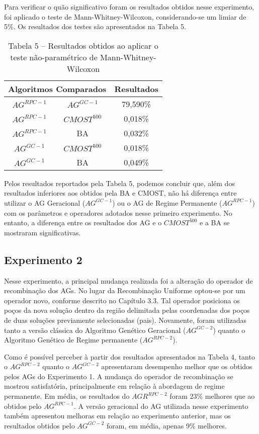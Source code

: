 Para verificar o quão significativo foram os resultados obtidos nesse experimento, foi aplicado o teste de Mann-Whitney-Wilcoxon, considerando-se um limiar de 5\%. Os resultados dos testes são apresentados na Tabela 5.

\begin{table}[H]
\centering
\caption{Tabela 5 – Resultados obtidos ao aplicar o teste não-paramétrico de Mann-Whitney-Wilcoxon}

\begin{tabular}{|c|c|c|}
\hline
\multicolumn{2}{|c|}{Algoritmos Comparados} & Resultados \\ \hline
$AG^{RPC-1}$ &	$AG^{GC-1}$ & 79,590\% \\ \hline
$AG^{RPC-1}$ & $CMOST^500$ & 0,018\% \\ \hline
$AG^{RPC-1}$ & BA & 0,032\% \\ \hline
$AG^{GC-1}$ & $CMOST^500$ & 0,018\% \\ \hline
$AG^{GC-1}$ & BA & 0,049\% \\ \hline

\end{tabular}
\end{table}

Pelos resultados reportados pela Tabela 5, podemos concluir que, além dos resultados inferiores aos obtidos pela BA e CMOST, não há diferença entre utilizar o AG Geracional ($AG^{GC-1}$) ou o AG de Regime Permanente ($AG^{RPC-1}$) com os parâmetros e operadores adotados nesse primeiro experimento. No entanto, a diferença entre os resultados dos AG e o $CMOST^500$ e a BA se mostraram  significativas.

\subsection{Experimento 2}

Nesse experimento, a principal mudança realizada foi a alteração do operador de recombinação dos AGs. No lugar da Recombinação Uniforme optou-se por um operador novo, conforme descrito no Capítulo 3.3. Tal operador posiciona os poços da nova solução dentro da região delimitada pelas coordenadas dos poços de duas soluções previamente selecionadas (pais). Novamente, foram utilizadas tanto a versão clássica do Algoritmo Genético Geracional ($AG^{GC-2}$) quanto o Algoritmo Genético de Regime permanente ($AG^{RPC-2}$).

Como é possível perceber à partir dos resultados apresentados na Tabela 4, tanto o $AG^{RPC-2}$ quanto o $AG^{GC-2}$ apresentaram desempenho melhor que os obtidos pelos AGs do Experimento 1. A mudança do operador de recombinação se mostrou satisfatória, principalmente em relação à abordagem de regime permanente. Em média, os resultados do $AGR^{RPC-2}$ foram 23\% melhores que ao obtidos pelo $AG^{RPC-1}$. A versão geracional do AG utilizada nesse experimento também apresentou melhoras em relação ao experimento anterior, mas os resultados obtidos pelo $AG^{GC-2}$ foram, em média, apenas 9\% melhores.

